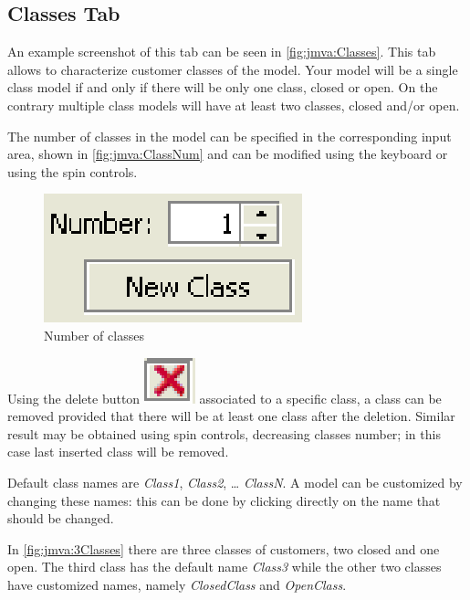 \subsection{Classes Tab}
An example screenshot of this tab can be seen in
\autoref{fig:jmva:Classes}. This tab allows to characterize customer
classes of the model. Your model will be a single class model if and
only if there will be only one class, closed or open. On the
contrary multiple class models will have at least two classes,
closed and/or open.

The number of classes in the model can be specified in the
corresponding input area, shown in \autoref{fig:jmva:ClassNum} and
can be modified using the keyboard or using the spin controls.

\begin{figure}[htbp]
    \begin{center}
        \includegraphics[scale=.5]{img/jmva/classNum}
    \end{center}
    \caption{Number of classes}
    \label{fig:jmva:ClassNum}
\end{figure}

Using the delete button
\includegraphics[scale=.6]{img/jmva/x} associated to a specific
class, a class can be removed provided that there will be at least
one class after the deletion. Similar result may be obtained using
spin controls, decreasing classes number; in this case last inserted
class will be removed.

Default class names are \emph{Class1}, \emph{Class2}, \dots
\emph{ClassN}. A model can be customized by changing these names: this can be done by clicking directly on the name that should be changed.

In \autoref{fig:jmva:3Classes} there are three classes of customers,
two closed and one open. The third class has the default name
\emph{Class3} while the other two classes have customized names,
namely \emph{ClosedClass} and \emph{OpenClass}.

